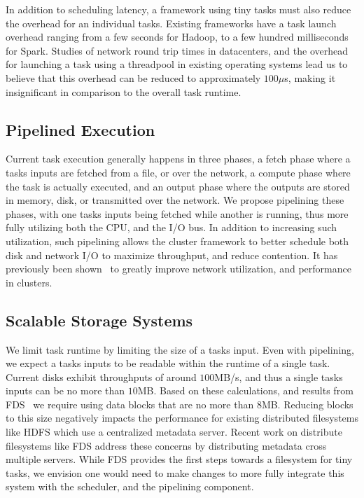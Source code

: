 In addition to scheduling latency, a framework using tiny tasks must also reduce the overhead
for an individual tasks. Existing frameworks have a task launch overhead ranging from a few
seconds for Hadoop, to a few hundred milliseconds for Spark. Studies of network round trip times
in datacenters, and the overhead for launching a task using a threadpool in existing operating
 systems lead us to believe that this overhead can be reduced to approximately $100 \mu$s, making
it insignificant in comparison to the overall task runtime.

\subsection{Pipelined Execution}
\label{sec:pipeline}
Current task execution generally happens in three phases, a fetch phase where a tasks
inputs are fetched from a file, or over the network, a compute phase where the task is actually
executed, and an output phase where the outputs are stored in memory, disk, or transmitted over
the network. We propose pipelining these phases, with one tasks inputs being fetched while another
is running, thus more fully utilizing both the CPU, and the I/O bus. In addition to increasing such
utilization, such pipelining allows the cluster framework to better schedule both disk and network
I/O to maximize throughput, and reduce contention. It has previously been shown~\cite{chowdhury2011managing,
chowdhury2012coflow} to greatly improve network utilization, and performance in clusters.

\subsection{Scalable Storage Systems}
We limit task runtime by limiting the size of a tasks input. Even with pipelining, we
expect a tasks inputs to be readable within the runtime of a single task. Current disks exhibit
throughputs of around $100$MB/s, and thus a single tasks inputs can be no more than $10$MB. Based
on these calculations, and results from FDS~\cite{nightingale2012flat} we require using data blocks
that are no more than $8$MB. Reducing blocks to this size negatively impacts the performance for
existing distributed filesystems like HDFS which use a centralized metadata server. Recent work on
distribute filesystems like FDS address these concerns by distributing metadata cross multiple
servers. While FDS provides the first steps towards a filesystem for tiny tasks, we envision
one would need to make changes to more fully integrate this system with the scheduler, and
the pipelining component.


